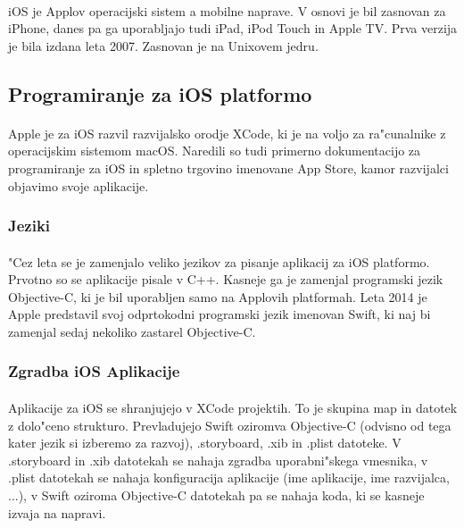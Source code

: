 \paragraph{}iOS je Applov operacijski sistem a mobilne naprave. V osnovi je bil zasnovan za iPhone, danes pa ga uporabljajo tudi iPad, iPod Touch in Apple TV. Prva verzija je bila izdana leta 2007. Zasnovan je na Unixovem jedru.

\subsection{Programiranje za iOS platformo}
\paragraph{}Apple je za iOS razvil razvijalsko orodje XCode, ki je na voljo za ra"cunalnike z operacijskim sistemom macOS. Naredili so tudi primerno dokumentacijo za programiranje za iOS in spletno trgovino imenovane App Store, kamor razvijalci objavimo svoje aplikacije.

\subsubsection{Jeziki}
\paragraph{}"Cez leta se je zamenjalo veliko jezikov za pisanje aplikacij za iOS platformo. Prvotno so se aplikacije pisale v C++. Kasneje ga je zamenjal programski jezik Objective-C, ki je bil uporabljen samo na Applovih platformah. Leta 2014 je Apple predstavil svoj odprtokodni programski jezik imenovan Swift, ki naj bi zamenjal sedaj nekoliko zastarel Objective-C.

\subsubsection{Zgradba iOS Aplikacije}
\paragraph{}Aplikacije za iOS se shranjujejo v XCode projektih. To je skupina map in datotek z dolo"ceno strukturo. Prevladujejo Swift oziromva Objective-C (odvisno od tega kater jezik si izberemo za razvoj), .storyboard, .xib in .plist datoteke. V .storyboard in .xib datotekah se nahaja zgradba uporabni"skega vmesnika, v .plist datotekah se nahaja konfiguracija aplikacije (ime aplikacije, ime razvijalca, ...), v Swift oziroma Objective-C datotekah pa se nahaja koda, ki se kasneje izvaja na napravi.	

